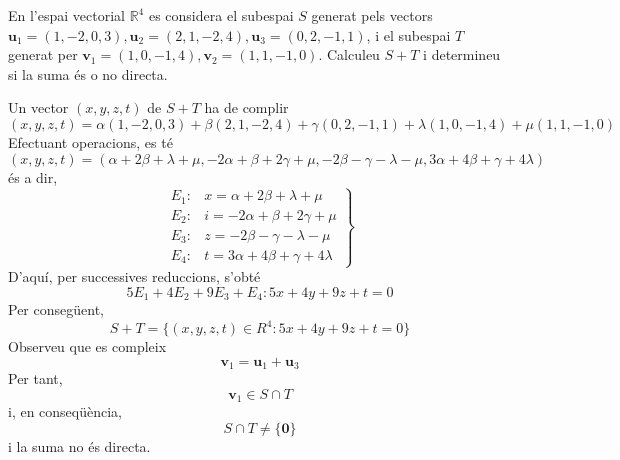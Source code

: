 \begin{exercici}
En l’espai vectorial $\mathbb{R}^{4}$ es considera el subespai $S$ generat pels vectors $\mathbf{u}_{1}=(1,-2,0,3),\mathbf{u}%
_{2}=(2,1,-2,4),\mathbf{u}_{3}=(0,2,-1,1)$, i el subespai $T$
generat per $\mathbf{v}_{1}=(1,0,-1,4),\mathbf{v}_{2}=(1,1,-1,0)$.
Calculeu $S+T$ i determineu si la suma és o no directa.

\end{exercici}
\begin{solucio}
Un vector $(x,y,z,t)$ de $S+T$ ha de complir%
\begin{equation*}
(x,y,z,t)=\alpha (1,-2,0,3)+\beta (2,1,-2,4)+\gamma (0,2,-1,1)+\lambda
(1,0,-1,4)+\mu (1,1,-1,0)
\end{equation*}%
Efectuant operacions, es té%
\begin{equation*}
(x,y,z,t)=(\alpha +2\beta +\lambda +\mu ,-2\alpha +\beta +2\gamma +\mu
,-2\beta -\gamma -\lambda -\mu ,3\alpha +4\beta +\gamma +4\lambda )
\end{equation*}%
és a dir,%
\begin{equation*}
\left.
\begin{array}{ll}
E_{1}: & x=\alpha +2\beta +\lambda +\mu \\
E_{2}: & i=-2\alpha +\beta +2\gamma +\mu \\
E_{3}: & z=-2\beta -\gamma -\lambda -\mu \\
E_{4}: & t=3\alpha +4\beta +\gamma +4\lambda%
\end{array}%
\right\}
\end{equation*}%
D’aquí, per successives reduccions, s’obté%
\begin{equation*}
5E_{1}+4E_{2}+9E_{3}+E_{4}:5x+4y+9z+t=0
\end{equation*}%
Per consegüent,%
\begin{equation*}
S+T=\{(x,y,z,t)\in R^{4}:5x+4y+9z+t=0\}
\end{equation*}%
Observeu que es compleix%
\begin{equation*}
\mathbf{v}_{1}=\mathbf{u}_{1}+\mathbf{u}_{3}
\end{equation*}%
Per tant,%
\begin{equation*}
\mathbf{v}_{1}\in S\cap T
\end{equation*}%
i, en conseqüència,%
\begin{equation*}
S\cap T\neq \{\mathbf{0}\}
\end{equation*}%
i la suma no és directa.
\end{solucio}

